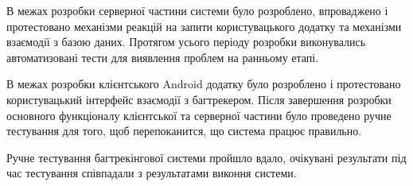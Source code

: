 \documentclass[../main.tex]{subfiles}
\begin{document}
В межах розробки серверної частини системи було розроблено, впроваджено і протестовано механізми реакцій на запити користувацького додатку та механізми взаємодії з базою даних. Протягом усього періоду розробки виконувались автоматизовані тести для виявлення проблем на ранньому етапі.

В межах розробки клієнтського Android додатку було розроблено і протестовано користувацький інтерфейс взаємодії з багтрекером. Після завершення розробки основного функціоналу клієнтської та серверної частини було проведено ручне тестування для того, щоб перепоканится, що система працює правильно.

Ручне тестування багтрекінгової системи пройшло вдало, очікувані результати під час тестування співпадали з результатами виконня системи.
\end{document}
